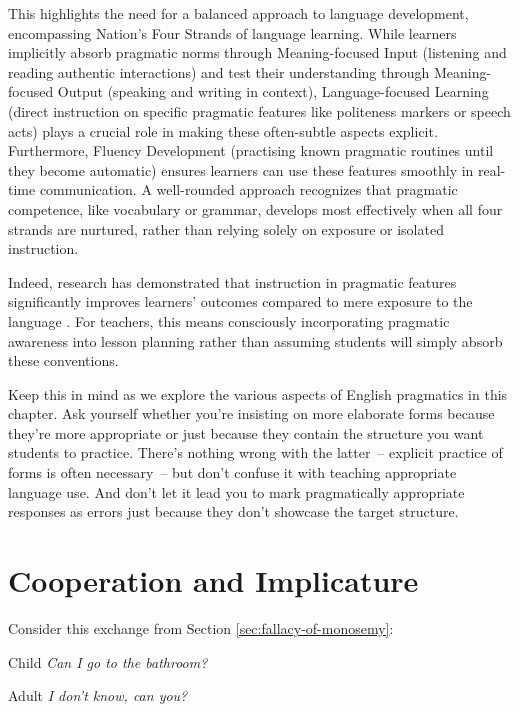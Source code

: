 This highlights the need for a balanced approach to language development, encompassing Nation's Four Strands of language learning. While learners implicitly absorb pragmatic norms through Meaning-focused Input (listening and reading authentic interactions) and test their understanding through Meaning-focused Output (speaking and writing in context), Language-focused Learning (direct instruction on specific pragmatic features like politeness markers or speech acts) plays a crucial role in making these often-subtle aspects explicit. Furthermore, Fluency Development (practising known pragmatic routines until they become automatic) ensures learners can use these features smoothly in real-time communication. A well-rounded approach recognizes that pragmatic competence, like vocabulary or grammar, develops most effectively when all four strands are nurtured, rather than relying solely on exposure or isolated instruction.

Indeed, research has demonstrated that instruction in pragmatic features significantly improves learners' outcomes compared to mere exposure to the language \autocite{JeonKaya2006, RenLiLu2022}. For teachers, this means consciously incorporating pragmatic awareness into lesson planning rather than assuming students will simply absorb these conventions.

Keep this in mind as we explore the various aspects of English pragmatics in this chapter. Ask yourself whether you're insisting on more elaborate forms because they're more appropriate or just because they contain the structure you want students to practice. There's nothing wrong with the latter~-- explicit practice of forms is often necessary~-- but don't confuse it with teaching appropriate language use. And don't let it lead you to mark pragmatically appropriate responses as errors just because they don't showcase the target structure.




\section{Cooperation and Implicature}\label{sec:implicature}

Consider this exchange from Section \ref{sec:fallacy-of-monosemy}:

\begin{dialogue}
\item[Child] \textit{Can I go to the bathroom?}
\item[Adult] \textit{I don't know, can you?}
\end{dialogue}

